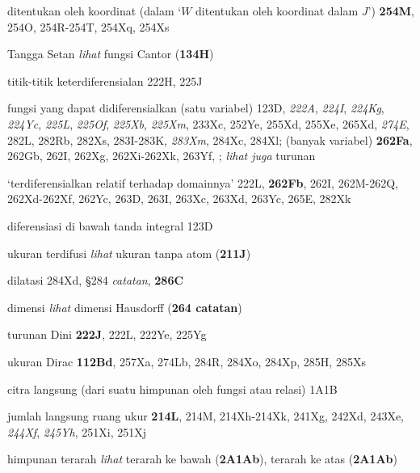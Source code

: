 ditentukan oleh koordinat (dalam `$W$ ditentukan oleh koordinat dalam
$J$') {\bf 254M}, 254O, 254R-254T, 
254Xq, 254Xs





Tangga Setan {\it lihat} fungsi Cantor ({\bf 134H})











titik-titik keterdiferensialan 222H, 225J


fungsi yang dapat didiferensialkan (satu variabel) 123D,
  {\it 222A}, {\it 224I}, {\it 224Kg}, {\it 224Yc}, {\it 225L}, {\it
225Of}, {\it 225Xb}, {\it 225Xm}, 233Xc, 252Ye, 255Xd, 255Xe,
265Xd, {\it 274E}, 282L, 282Rb, 282Xs,
283I-283K, 
{\it 283Xm}, 284Xc, 284Xl; (banyak variabel) {\bf 262Fa}, 262Gb, 262I, 262Xg,
262Xi-262Xk, 
263Yf, ;  
  {\it lihat juga} turunan


`terdiferensialkan relatif terhadap domainnya' 222L, {\bf 262Fb}, 262I,
262M-262Q, 
262Xd-262Xf, 
262Yc, 263D, 263I, 263Xc, 263Xd, 263Yc, 265E, 282Xk


diferensiasi di bawah tanda integral 123D

ukuran terdifusi {\it lihat} ukuran tanpa atom ({\bf 211J})


dilatasi 284Xd, \S284 {\it catatan}, {\bf 286C}


dimensi {\it lihat} dimensi Hausdorff ({\bf 264 catatan})


turunan Dini {\bf 222J}, 222L, 222Ye, 225Yg




ukuran Dirac {\bf 112Bd},
  257Xa, 274Lb, 284R, 284Xo, 284Xp, 285H, 285Xs

citra langsung (dari suatu himpunan oleh fungsi atau relasi) 1A1B

jumlah langsung ruang ukur {\bf 214L}, 214M,
214Xh-214Xk, 
241Xg, 242Xd, 243Xe, {\it 244Xf}, {\it 245Yh}, 251Xi, 251Xj






himpunan terarah
{\it lihat} terarah ke bawah ({\bf 2A1Ab}),
terarah ke atas ({\bf 2A1Ab})


